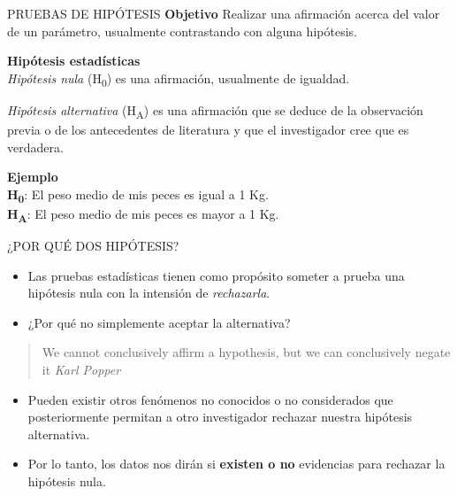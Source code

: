 \documentclass[
  ignorenonframetext,
]{beamer}
\begin{document}
\begin{frame}{PRUEBAS DE HIPÓTESIS}
\protect\hypertarget{pruebas-de-hipuxf3tesis}{}
\textbf{Objetivo} Realizar una afirmación acerca del valor de un
parámetro, usualmente contrastando con alguna hipótesis.

\textbf{Hipótesis estadísticas}\\
\emph{Hipótesis nula} (H\textsubscript{0}) es una afirmación, usualmente
de igualdad.

\emph{Hipótesis alternativa} (H\textsubscript{A}) es una afirmación que
se deduce de la observación previa o de los antecedentes de literatura y
que el investigador cree que es verdadera.

\textbf{Ejemplo}\\
\textbf{H\textsubscript{0}}: El peso medio de mis peces es igual a 1
Kg.\\
\textbf{H\textsubscript{A}}: El peso medio de mis peces es mayor a 1 Kg.
\end{frame}

\begin{frame}{¿POR QUÉ DOS HIPÓTESIS?}
\protect\hypertarget{por-quuxe9-dos-hipuxf3tesis}{}
\begin{itemize}
\item
  Las pruebas estadísticas tienen como propósito someter a prueba una
  hipótesis nula con la intensión de \emph{rechazarla}.
\item
  ¿Por qué no simplemente aceptar la alternativa?
\end{itemize}

\begin{quote}
We cannot conclusively affirm a hypothesis, but we can conclusively
negate it \emph{Karl Popper}
\end{quote}

\begin{itemize}
\item
  Pueden existir otros fenómenos no conocidos o no considerados que
  posteriormente permitan a otro investigador rechazar nuestra hipótesis
  alternativa.
\item
  Por lo tanto, los datos nos dirán si \textbf{existen o no } evidencias
  para rechazar la hipótesis nula.
\end{itemize}
\end{frame}
\end{document}
